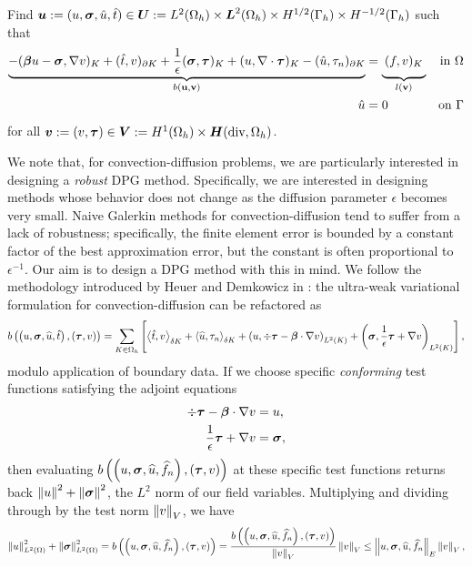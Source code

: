 \documentclass{report}
\begin{document}
Find
$\boldsymbol{u}:=(u,\boldsymbol\sigma,\hat u,\hat t)
\in\boldsymbol{U}:=L^2(\Omega_h)\times \boldsymbol{L}^2(\Omega_h)\times H^{1/2}(\Gamma_h)\times H^{-1/2}(\Gamma_h)$
such that
\begin{align}
\label{eq:variationalFormulation}
\underbrace{-(\bfbeta u-\bfsigma,\nabla v)_K+(\hat t,v)_{\partial K}
+ \frac{1}{\epsilon}(\bfsigma,\bftau)_K
+(u,\nabla\cdot\bftau)_K
-(\hat u,\tau_n)_{\partial K}}_{b(\mathbf{u}, \mathbf{v})}
&=\underbrace{\:(f,v)_K\genfrac{}{}{0pt}{}{}{}}_{l(\mathbf{v})} &\text{in }\Omega \\
\hat u&=0 &\text{on }\Gamma
\end{align}
for all $\boldsymbol{v}:=(v,\boldsymbol\tau)\in
\boldsymbol{V}:=H^1(\Omega_h)\times\mbox{\boldmath $H$}(\text{div},\Omega_h)$.


We note that, for convection-diffusion problems, we are particularly
interested in designing a \textit{robust} DPG method.  Specifically, we are
interested in designing methods whose behavior does not change as the
diffusion parameter $\epsilon$ becomes very small.  Naive Galerkin methods for
convection-diffusion tend to suffer from a lack of robustness; specifically,
the finite element error is bounded by a constant factor of the best
approximation error, but the constant is often proportional to
$\epsilon^{-1}$.  Our aim is to design a DPG method with this in mind.  We
follow the methodology introduced by Heuer and Demkowicz in
\cite{DemkowiczHeuer}: the ultra-weak variational formulation for
convection-diffusion can be refactored as
\[
b\left( \left( u,\boldsymbol\sigma,\widehat{u},\hat t \right),\left( \boldsymbol\tau,v \right) \right) =
\sum_{K\in \Omega_h}\left[ \left\langle \hat t,v \right\rangle_{\delta K}
+\left\langle \widehat{u},\tau_n \right\rangle_{\delta K} + \left( u,\div \boldsymbol\tau
-\boldsymbol\beta\cdot\nabla v \right)_{L^2(K)}
+\left( \boldsymbol\sigma,\frac{1}{\epsilon} \boldsymbol\tau + \nabla v \right)_{L^2(K)} \right],
\]
modulo application of boundary data.  If we choose specific
\textit{conforming} test functions satisfying the adjoint equations
\begin{align*}
\div \boldsymbol\tau - \boldsymbol\beta \cdot \nabla v &= u,\\
\frac{1}{\epsilon} \boldsymbol\tau + \nabla v &= \boldsymbol\sigma,
\end{align*}
then evaluating $b\left( \left( u,\boldsymbol\sigma,\widehat{u},\widehat{f}_n \right),\left( \boldsymbol\tau,v \right) \right)$ at these
specific test functions returns back $\left\| u \right\|^2 + \left\| \boldsymbol\sigma \right\|^2$, the $L^2$
norm of our field variables.  Multiplying and dividing through by the test
norm $\left\| v \right\|_V$, we have
\[
\left\| u \right\|_{L^2\left( \Omega \right)}^2 + \left\| \boldsymbol\sigma \right\|_{L^2\left( \Omega \right)}^2 =
b\left( \left( u,\boldsymbol\sigma,\widehat{u},\widehat{f}_n \right),\left( \boldsymbol\tau,v \right) \right) =
\frac{b\left( \left( u,\boldsymbol\sigma,\widehat{u},\widehat{f}_n \right),\left( \boldsymbol\tau,v \right) \right)}{\left\| v \right\|_V}\left\| v \right\|_V
\leq \left\| u,\boldsymbol\sigma,\widehat{u},\widehat{f}_n \right\|_E\left\| v \right\|_V,
\]
\end{document}
